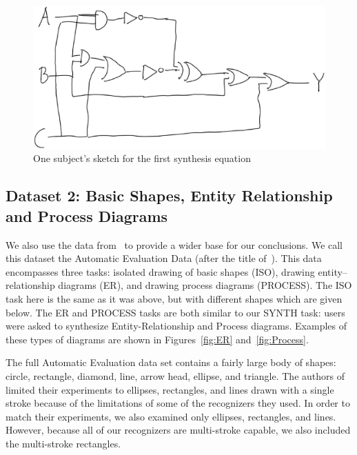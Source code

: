 \documentclass[final,5p,twocolumn]{elsarticle}
\begin{document}
\begin{figure}
\includegraphics[width=1.0\hsize]{eqDrawing.eps}
\caption{One subject's sketch for the first synthesis equation}
\label{synthFig}
\end{figure}

\subsection{Dataset 2: Basic Shapes, Entity Relationship and Process Diagrams}
We also use the data from~\cite{schmieder09} to provide a wider base for our conclusions.
We call this dataset the Automatic Evaluation Data (after the title of~\cite{schmieder09}).
This data encompasses three tasks: isolated drawing of basic shapes (ISO),
drawing entity--relationship diagrams (ER), and drawing process diagrams (PROCESS).
The ISO task here is the same as it was above, but with different shapes which are
given below.
The ER and PROCESS tasks are both similar to our SYNTH task: users were asked 
to synthesize Entity-Relationship and Process diagrams.  Examples of these types of
diagrams are shown in Figures~\ref{fig:ER} and~\ref{fig:Process}.

The full Automatic Evaluation data set contains a fairly large body of shapes: 
circle, rectangle, diamond, line, arrow head, ellipse, and triangle.  
The authors of \cite{schmieder09} limited their experiments to 
ellipses, rectangles, and lines drawn with a single stroke because of the limitations 
of some of the recognizers they used.  In order to match their experiments,  
we also examined only ellipses, rectangles, and lines.  
However, because all of our recognizers are multi-stroke capable, we also included 
the multi-stroke rectangles.
\end{document}
